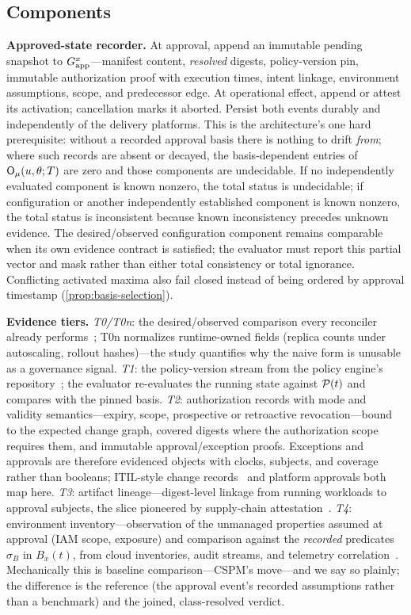 \subsection{Components}
\textbf{Approved-state recorder.} At approval, append an immutable pending
snapshot to $G_{\mathrm{app}}^x$---manifest content, \emph{resolved} digests, policy-version pin,
immutable authorization proof with execution times, intent linkage, environment
assumptions, scope, and predecessor edge. At operational effect, append or
attest its activation; cancellation marks it aborted. Persist both events
durably and independently of the delivery
platforms. This is the architecture's one hard prerequisite: without a
recorded approval basis there is nothing to drift \emph{from}; where such
records are absent or decayed, the basis-dependent entries of
$\mathsf{O}_{\mu}(u,\theta;T)$ are zero and those components are undecidable. If
no independently evaluated component is known nonzero, the total status is
undecidable; if configuration or another independently established component
is known nonzero, the total status is inconsistent because known inconsistency
precedes unknown evidence. The desired/observed configuration component remains
comparable when its own evidence contract is satisfied; the evaluator must
report this partial vector and mask rather than either total consistency or
total ignorance.
Conflicting activated maxima also fail closed instead of being
ordered by approval timestamp (\cref{prop:basis-selection}).

\textbf{Evidence tiers.}
\emph{T0/T0n}: the desired/observed comparison every reconciler already
performs~\cite{argocd,fluxcd,awsconfig}; T0n normalizes runtime-owned fields
(replica counts under autoscaling, rollout hashes)---the study quantifies why
the naive form is unusable as a governance signal.
\emph{T1}: the policy-version stream from the policy engine's
repository~\cite{opa,kyverno}; the evaluator re-evaluates the running state
against $\mathcal{P}(t)$ and compares with the pinned basis.
\emph{T2}: authorization records with mode and validity semantics---expiry,
scope, prospective or retroactive revocation---bound to the expected change
graph, covered digests where the authorization scope requires them, and
immutable approval/exception proofs. Exceptions and approvals are therefore
evidenced objects with clocks, subjects, and coverage rather than booleans;
ITIL-style change records~\cite{itil4} and platform approvals both map here.
\emph{T3}: artifact lineage---digest-level linkage from running workloads to
approval subjects, the slice pioneered by supply-chain
attestation~\cite{slsa,torres2019,newman2022,binauthz}.
\emph{T4}: environment inventory---observation of the unmanaged properties
assumed at approval (IAM scope, exposure) and comparison against the
\emph{recorded} predicates $\sigma_B$ in $B_x(t)$, from cloud inventories,
audit streams, and telemetry correlation~\cite{cloudtrail,cspm,otel}.
Mechanically this is baseline comparison---CSPM's move---and we say so
plainly; the difference is the reference (the approval event's recorded
assumptions rather than a benchmark) and the joined, class-resolved verdict.

